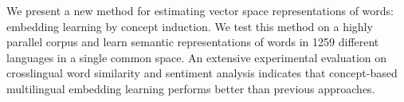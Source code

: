 We present a new method for estimating vector space representations of words: embedding learning by concept induction. We test this method on a highly parallel corpus and learn semantic representations of words in 1259 different languages in a single common space. An extensive experimental evaluation on crosslingual word similarity and sentiment analysis indicates that concept-based multilingual embedding learning performs better than previous approaches.
